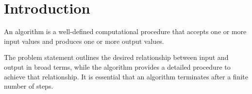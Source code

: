 \section{Introduction}

\begin{definition}
    An algorithm is a well-defined computational procedure that accepts one or more input values and produces one or more output values.
\end{definition}
The problem statement outlines the desired relationship between input and output in broad terms, while the algorithm provides a detailed procedure to achieve that relationship.
It is essential that an algorithm terminates after a finite number of steps.